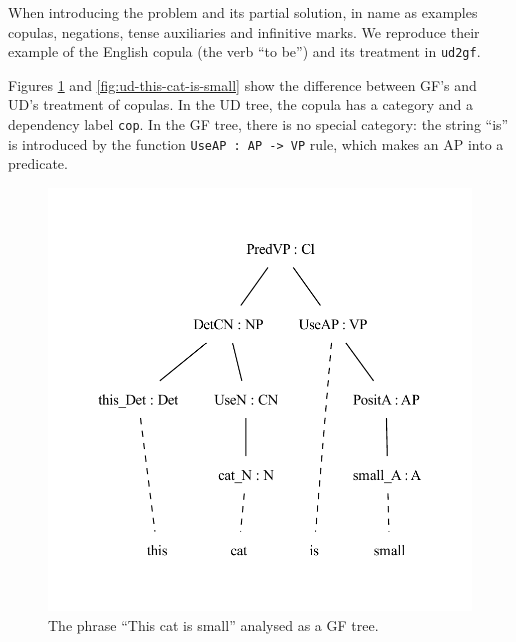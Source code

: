 

When introducing the problem and its partial solution, in \cite{kolachina-ranta-2017} \citeauthor{kolachina-ranta-2017} name as examples copulas, negations, tense auxiliaries and infinitive marks. We reproduce their example of the English copula (the verb ``to be'') and its treatment in \verb|ud2gf|.

Figures \ref{fig:gf-this-cat-is-small} and \ref{fig:ud-this-cat-is-small} show the difference between GF's and UD's treatment of copulas. In the UD tree, the copula has a category and a dependency label \verb|cop|. In the GF tree, there is no special category: the string ``is'' is introduced by the function \verb|UseAP : AP -> VP| rule, which makes an AP into a predicate.

\begin{figure}
    \centering
    \includegraphics{figure/thiscatissmall.pdf}
    \caption{The phrase ``This cat is small'' analysed as a GF tree.}
    \label{fig:gf-this-cat-is-small}
\end{figure}


